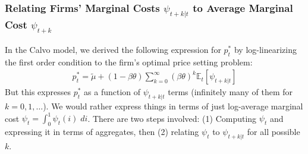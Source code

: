 \documentclass[12pt]{article}
\theoremstyle{plain}
\theoremstyle{definition}
\theoremstyle{remark}
\newcommand{\E}{\mathbb{E}}
\begin{document}
\clearpage
\subsubsection{Relating Firms' Marginal Costs $\psi_{t+k|t}$ to Average Marginal Cost $\psi_{t+k}$}

In the Calvo model, we derived the following expression for $p_t^*$
by log-linearizing the first order condition to the firm's optimal
price setting problem:
\begin{align}
  p_t^*
  =
  \tilde{\mu} +
  (1-\beta\theta)\sum_{k=0}^\infty
  (\beta\theta)^k
  \E_t[ \psi_{t+k|t} ]
  \label{calvomcrelate}
\end{align}
But this expresses $p_t^*$ as a function of $\psi_{t+k|t}$ terms
(infinitely many of them for $k=0,1,\ldots$).
We would rather express things in terms of just log-average marginal
cost $\psi_t = \int_0^1\psi_{t}(i)\;di$.
There are two steps involved: (1) Computing $\psi_t$ and expressing it
in terms of aggregates, then (2) relating $\psi_t$ to $\psi_{t+k|t}$
for all possible $k$.
\end{document}

